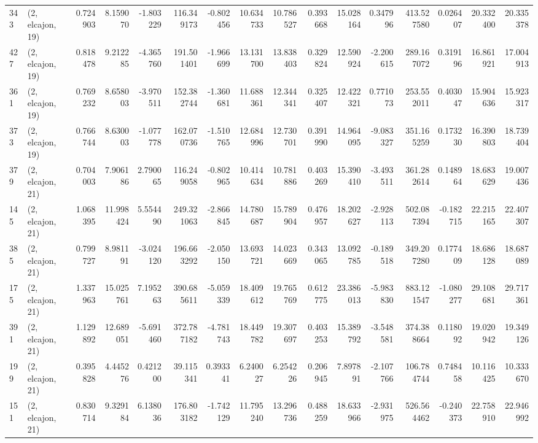 \begin{tabular}{llrrrrrrrrrrrrrr}
343 &  (2, elcajon, 19) &   0.724903 &   8.159070 &  -1.803229 &   116.349173 &  -0.802456 &  10.634733 &  10.786527 &  0.393668 &  15.028164 &   0.347996 &   413.527580 &   0.026407 &  20.332400 &  20.335378 \\
427 &  (2, elcajon, 19) &   0.818478 &   9.212285 &  -4.365760 &   191.501401 &  -1.966699 &  13.131700 &  13.838403 &  0.329824 &  12.590924 &  -2.200615 &   289.167072 &   0.319196 &  16.861921 &  17.004913 \\
361 &  (2, elcajon, 19) &   0.769232 &   8.658003 &  -3.970511 &   152.382744 &  -1.360681 &  11.688361 &  12.344341 &  0.325407 &  12.422321 &   0.771073 &   253.552011 &   0.403047 &  15.904636 &  15.923317 \\
373 &  (2, elcajon, 19) &   0.766744 &   8.630003 &  -1.077778 &   162.070736 &  -1.510765 &  12.684996 &  12.730701 &  0.391990 &  14.964095 &  -9.083327 &   351.165259 &   0.173230 &  16.390803 &  18.739404 \\
379 &  (2, elcajon, 21) &   0.704003 &   7.906186 &   2.790065 &   116.249058 &  -0.802965 &  10.414634 &  10.781886 &  0.403269 &  15.390410 &  -3.493511 &   361.282614 &   0.148964 &  18.683629 &  19.007436 \\
145 &  (2, elcajon, 21) &   1.068395 &  11.998424 &   5.554490 &   249.321063 &  -2.866845 &  14.780687 &  15.789904 &  0.476957 &  18.202627 &  -2.928113 &   502.087394 &  -0.182715 &  22.215165 &  22.407307 \\
385 &  (2, elcajon, 21) &   0.799727 &   8.981191 &  -3.024120 &   196.663292 &  -2.050150 &  13.693721 &  14.023669 &  0.343065 &  13.092785 &  -0.189518 &   349.207280 &   0.177409 &  18.686128 &  18.687089 \\
175 &  (2, elcajon, 21) &   1.337963 &  15.025761 &   7.195263 &   390.685611 &  -5.059339 &  18.409612 &  19.765769 &  0.612775 &  23.386013 &  -5.983830 &   883.121547 &  -1.080277 &  29.108681 &  29.717361 \\
391 &  (2, elcajon, 21) &   1.129892 &  12.689051 &  -5.691460 &   372.787182 &  -4.781743 &  18.449782 &  19.307697 &  0.403253 &  15.389792 &  -3.548581 &   374.388664 &   0.118092 &  19.020942 &  19.349126 \\
199 &  (2, elcajon, 21) &   0.395828 &   4.445276 &   0.421200 &    39.115341 &   0.393341 &   6.240027 &   6.254226 &  0.206945 &   7.897891 &  -2.107766 &   106.784744 &   0.748458 &  10.116425 &  10.333670 \\
151 &  (2, elcajon, 21) &   0.830714 &   9.329184 &   6.138036 &   176.803182 &  -1.742129 &  11.795240 &  13.296736 &  0.488259 &  18.633966 &  -2.931975 &   526.564462 &  -0.240373 &  22.758910 &  22.946992 \\

\end{tabular}
